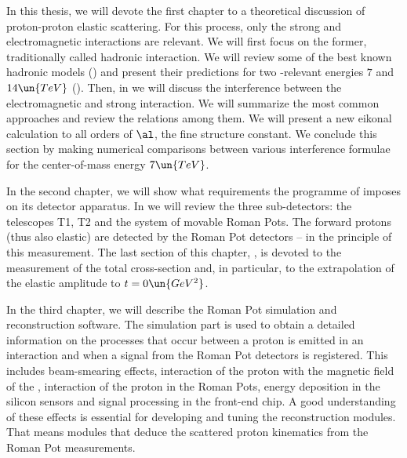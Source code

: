 
In this thesis, we will devote the first chapter to a theoretical discussion of proton-proton elastic scattering. For this process, only the strong and electromagnetic interactions are relevant. We will first focus on the former, traditionally called hadronic interaction. We will review some of the best known hadronic models () and present their predictions for two -relevant energies $7$ and $14\un{TeV}$ (). Then, in  we will discuss the interference between the electromagnetic and strong interaction. We will summarize the most common approaches and review the relations among them. We will present a new eikonal calculation to all orders of $\al$, the fine structure constant. We conclude this section by making numerical comparisons between various interference formulae for the center-of-mass energy $7\un{TeV}$.

In the second chapter, we will show what requirements the programme of  imposes on its detector apparatus. In  we will review the three sub-detectors: the telescopes T1, T2 and the system of movable Roman Pots. The forward protons (thus also elastic) are detected by the Roman Pot detectors -- in  the principle of this measurement. The last section of this chapter, , is devoted to the measurement of the total cross-section and, in particular, to the extrapolation of the elastic amplitude to $t=0\un{GeV^2}$.

In the third chapter, we will describe the Roman Pot simulation and reconstruction software. The simulation part is used to obtain a detailed information on the processes that occur between a proton is emitted in an interaction and when a signal from the Roman Pot detectors is registered. This includes beam-smearing effects, interaction of the proton with the magnetic field of the , interaction of the proton in the Roman Pots, energy deposition in the silicon sensors and signal processing in the front-end chip. A good understanding of these effects is essential for developing and tuning the reconstruction modules. That means modules that deduce the scattered proton kinematics from the Roman Pot measurements.


